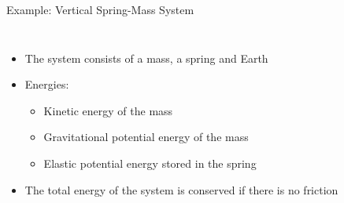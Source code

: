 \documentclass[12pt,compress,aspectratio=169]{beamer}
\begin{document}
\begin{frame}{Example: Vertical Spring-Mass System}
  \begin{columns}
    \begin{itemize}
    \item The system consists of a mass, a spring and Earth
    \item Energies:
      \begin{itemize}
      \item Kinetic energy of the mass
      \item Gravitational potential energy of the mass
      \item Elastic potential energy stored in the spring
      \end{itemize}
    \item The total energy of the system is conserved if there is no friction
    \end{itemize}
  \end{columns}
\end{frame}
\end{document}
